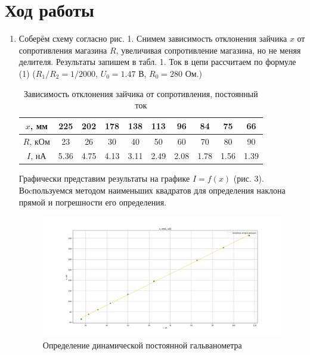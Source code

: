 \documentclass[a4paper]{article}
\begin{document}
\section{Ход работы}
\begin{enumerate}
    \item Соберём схему согласно рис. 1. Снимем зависимость отклонения зайчика $x$ от сопротивления магазина $R$, увеличивая сопротивление магазина, но не меняя делителя. Результаты запишем в табл. 1. Ток в цепи рассчитаем по формуле (1) ($R_1/R_2 = 1/2000$, $U_0 = 1.47$ В, $R_0 = 280$ Ом.)

          \begin{table}[H]
              \centering
              \begin{center}
                  \caption{Зависимость отклонения зайчика от сопротивления, постоянный ток}
              \end{center}
              \vspace{0.1cm}
              \label{tab:my_label}
              \begin{tabular}{|c|c|c|c|c|c|c|c|c|c|}
                  \hline
                  $x$, мм  & 225  & 202  & 178  & 138  & 113  & 96   & 84   & 75   & 66   \\
                  \hline
                  $R$, кОм & 23   & 26   & 30   & 40   & 50   & 60   & 70   & 80   & 90   \\
                  \hline
                  $I$, нА  & 5.36 & 4.75 & 4.13 & 3.11 & 2.49 & 2.08 & 1.78 & 1.56 & 1.39 \\
                  \hline
              \end{tabular}
          \end{table}

          Графически представим результаты на графике $I = f(x)$ (рис. 3). Воcпользуемся методом наименьших квадратов для определения наклона прямой и погрешности его определения.

          \begin{figure}[h]
              \centering
              \includegraphics[width=\textwidth]{Figure_!.png}
              \caption{Определение динамической постоянной гальванометра}
              \label{fig:vac}
          \end{figure}


\end{enumerate}
\end{document}
